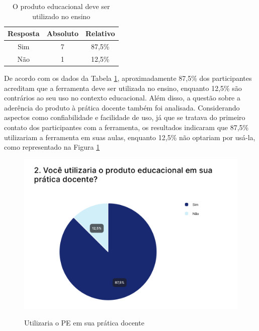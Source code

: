 
\begin{table}[h!]
    \centering
    \caption{O produto educacional deve ser utilizado no ensino}
    \begin{tabular}{c|c|c}
        \textbf{Resposta} &	\textbf{Absoluto} & \textbf{Relativo} \\
        \hline
        Sim & 7 & 87,5\% \\
        \hline
        Não & 1 & 12,5\% \\
    \end{tabular}
    \label{tab:p1}
\end{table}


De acordo com os dados da Tabela \ref{tab:p1}, aproximadamente 87,5\% dos participantes acreditam que a ferramenta deve ser utilizada no ensino, enquanto 12,5\% são contrários ao seu uso no contexto educacional. Além disso, a questão sobre a aderência do produto à prática docente também foi analisada. Considerando aspectos como confiabilidade e facilidade de uso, já que se tratava do primeiro contato dos participantes com a ferramenta, os resultados indicaram que 87,5\% utilizariam a ferramenta em suas aulas, enquanto 12,5\% não optariam por usá-la, como representado na Figura \ref{fig:p2}


\begin{figure}[h!]
    \caption{Utilizaria o PE em sua prática docente}
    \centering
    \includegraphics[scale=0.3]{figuras/resultados/p2.png}
    \label{fig:p2}
\end{figure}




